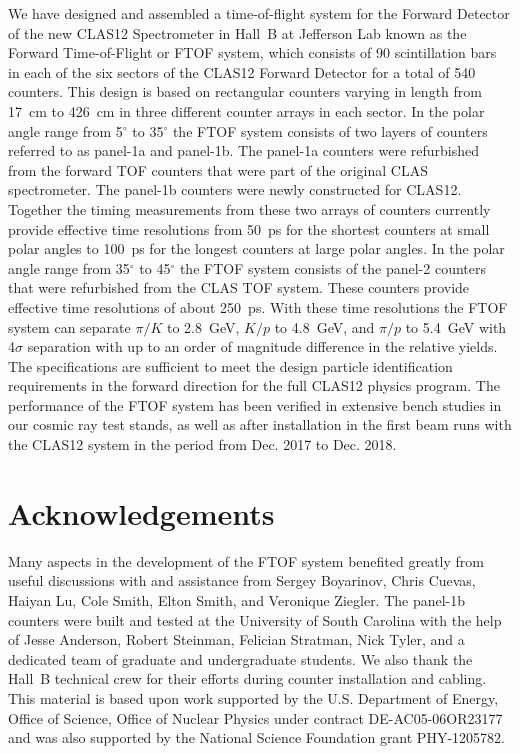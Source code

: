 \documentclass[3p,times,twocolumn]{elsarticle}
\begin{document}
We have designed and assembled a time-of-flight system for the Forward Detector of the new CLAS12
Spectrometer in Hall~B at Jefferson Lab known as the Forward Time-of-Flight or FTOF system, which
consists of 90 scintillation bars in each of the six sectors of the CLAS12 Forward Detector for a total of
540 counters. This design is based on rectangular counters varying in length from 17~cm to 426~cm in
three different counter arrays in each sector. In the polar angle range from 5$^\circ$ to 35$^\circ$ the
FTOF system consists of two layers of counters referred to as panel-1a and panel-1b. The panel-1a counters
were refurbished from the forward TOF counters that were part of the original CLAS spectrometer. The
panel-1b counters were newly constructed for CLAS12. Together the timing measurements from these
two arrays of counters currently provide effective time resolutions from 50~ps for the shortest counters at
small polar angles to 100~ps for the longest counters at large polar angles. In the polar angle range from
35$^\circ$ to 45$^\circ$ the FTOF system consists of the panel-2 counters that were refurbished from the
CLAS TOF system. These counters provide effective time resolutions of about 250~ps. With these time
resolutions the FTOF system can separate $\pi/K$ to 2.8~GeV, $K/p$ to 4.8~GeV, and $\pi/p$ to 5.4~GeV
with 4$\sigma$ separation with up to an order of magnitude difference in the relative yields. The specifications
are sufficient to meet the design particle identification requirements in the forward direction for the full
CLAS12 physics program. The performance of the FTOF system has been verified in extensive bench studies
in our cosmic ray test stands, as well as after installation in the first beam runs with the CLAS12 system in the
period from Dec. 2017 to Dec. 2018. 

\section*{Acknowledgements}

Many aspects in the development of the FTOF system benefited greatly from useful discussions with and
assistance from Sergey Boyarinov, Chris Cuevas, Haiyan Lu, Cole Smith, Elton Smith, and Veronique Ziegler. The
panel-1b counters were built and tested at the University of South Carolina with the help of Jesse Anderson,
Robert Steinman, Felician Stratman, Nick Tyler, and a dedicated team of graduate and undergraduate students.
We also thank the Hall~B technical crew for their efforts during counter installation and cabling. This material is
based upon work supported by the U.S. Department of Energy, Office of Science, Office of Nuclear Physics under
contract DE-AC05-06OR23177 and was also supported by the National Science Foundation grant PHY-1205782.
\end{document}
